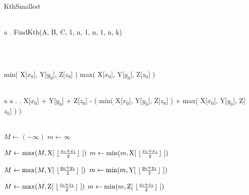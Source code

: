 \documentclass{article}
\begin{document}
\begin{algorithm}[H]
\caption{KthSmallest}
\begin{algorithmic}[1]

    \\ \phantom a \phantom .
    \Return FindKth(A, B, C, 1, n, 1, n, 1, n, k)
\EndFunction

\\


    \\

        \Return min( X[$x_0$], Y[$y_0$], Z[$z_0$] )
        \EndIf
        \Return max( X[$x_0$], Y[$y_0$], Z[$z_0$] )
        \EndIf

        \\
        \phantom a \phantom a \phantom . \phantom .
        \Return  X[$x_0$] + Y[$y_0$] + Z[$z_0$] - ( min( X[$x_0$], Y[$y_0$], Z[$z_0$] ) + max( X[$x_0$], Y[$y_0$], Z[$z_0$] ) )
    \EndIf

    \\
    \State $M \gets (-\infty)$
    \State $m \gets \infty$

        \State $M \gets \max(M, \text{X[ \begin{math} \lfloor \frac{x_0 + x_1}{2} \rfloor \end{math} ]})$
        \State $m \gets \min(m, \text{X[ \begin{math} \lfloor \frac{x_0 + x_1}{2} \rfloor \end{math} ]})$
    \EndIf

        \State $M \gets \max(M, \text{Y[ \begin{math} \lfloor \frac{y_0 + y_1}{2} \rfloor \end{math} ]})$
        \State $m \gets \min(m, \text{Y[ \begin{math} \lfloor \frac{y_0 + y_1}{2} \rfloor \end{math} ]})$
    \EndIf

        \State $M \gets \max(M, \text{Z[ \begin{math} \lfloor \frac{z_0 + z_1}{2} \rfloor \end{math} ]})$
        \State $m \gets \min(m, \text{Z[ \begin{math} \lfloor \frac{z_0 + z_1}{2} \rfloor \end{math} ]})$
    \EndIf
    

\end{algorithmic}
\end{algorithm}
\end{document}
